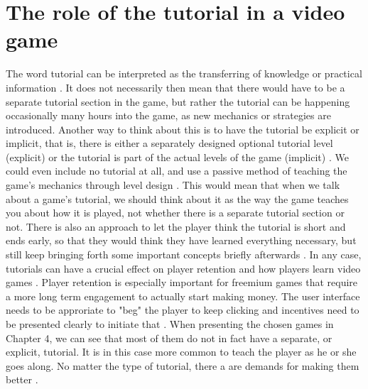 \section{The role of the tutorial in a video game}

The word tutorial can be interpreted as the transferring of knowledge or practical information \cite{tutorial}. It does not necessarily then mean that there would have to be a separate tutorial section in the game, but rather the tutorial can be happening occasionally many hours into the game, as new mechanics or strategies are introduced. Another way to think about this is to have the tutorial be explicit or implicit, that is, there is either a separately designed optional tutorial level (explicit) or the tutorial is part of the actual levels of the game (implicit) \cite{Adams2013}. We could even include no tutorial at all, and use a passive method of teaching the game's mechanics through level design \cite{Moss2017}. This would mean that when we talk about a game's tutorial, we should think about it as the way the game teaches you about how it is played, not whether there is a separate tutorial section or not. There is also an approach to let the player think the tutorial is short and ends early, so that they would think they have learned everything necessary, but still keep bringing forth some important concepts briefly afterwards \cite{Lee}. In any case, tutorials can have a crucial effect on player retention and how players learn video games \cite{Andersen2012}. Player retention is especially important for freemium games that require a more long term engagement to actually start making money. The user interface needs to be approriate to "beg" the player to keep clicking and incentives need to be presented clearly to initiate that \cite{Jarvinen2010}. When presenting the chosen games in Chapter 4, we can see that most of them do not in fact have a separate, or explicit, tutorial. It is in this case more common to teach the player as he or she goes along. No matter the type of tutorial, there a are demands for making them better \cite{Smith2017}.
